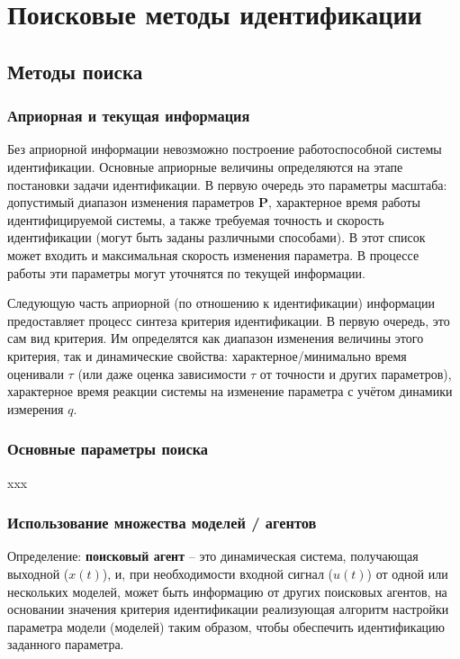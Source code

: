 \chapter{Поисковые методы идентификации}

\section{Методы поиска}

\subsection{Априорная и текущая информация}

Без априорной информации невозможно построение
работоспособной системы идентификации. Основные
априорные величины определяются на этапе постановки
задачи идентификации. В первую очередь это
параметры масштаба: допустимый диапазон
изменения параметров \( \mathbf{P}\),
характерное время работы
идентифицируемой системы, а также
требуемая точность и скорость идентификации
(могут быть заданы различными способами).
В этот список может входить и максимальная скорость изменения параметра.
В процессе работы эти параметры могут уточнятся по текущей информации.

Следующую часть априорной (по отношению к идентификации) информации
предоставляет процесс синтеза критерия идентификации.
В первую очередь, это сам вид критерия. Им определятся
как диапазон изменения величины этого критерия, так и
динамические свойства: характерное/минимально время
оценивали \(\tau\) (или даже оценка зависимости $\tau$ от точности и других параметров),
характерное время реакции системы на изменение
параметра с учётом динамики измерения \(q\).




\subsection{Основные параметры поиска}

xxx

\subsection{ Использование множества моделей / агентов}

Определение: \textbf{поисковый агент} -- это динамическая система, получающая выходной ($x(t)$),
и, при необходимости входной сигнал ($u(t)$) от одной или нескольких моделей,
может быть информацию от других поисковых агентов,
на основании значения критерия идентификации
реализующая алгоритм настройки параметра модели (моделей)
таким образом, чтобы обеспечить идентификацию заданного параметра.

